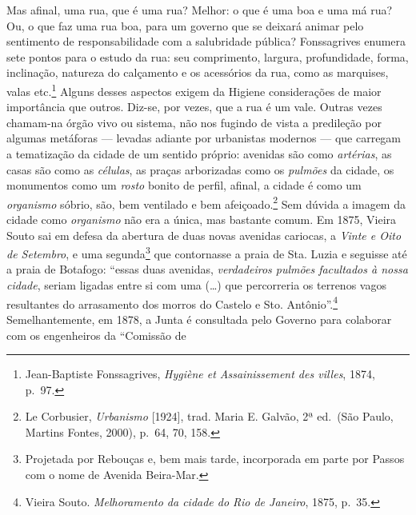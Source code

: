 Mas afinal, uma rua, que é uma rua? Melhor: o que é uma boa e uma má
rua? Ou, o que faz uma rua boa, para um governo que se deixará animar
pelo sentimento de responsabilidade com a salubridade pública?
Fonssagrives enumera sete pontos para o estudo da rua: seu comprimento,
largura, profundidade, forma, inclinação, natureza do calçamento e os
acessórios da rua, como as marquises, valas etc.\footnote{Jean-Baptiste
  Fonssagrives, \textit{Hygiène et Assainissement des villes}, 1874,
  p.~97.} Alguns desses aspectos exigem da Higiene considerações de
maior importância que outros. Diz-se, por vezes, que a rua é um vale.
Outras vezes chamam-na órgão vivo ou sistema, não nos fugindo de vista a
predileção por algumas metáforas --- levadas adiante por urbanistas
modernos --- que carregam a tematização da cidade de um sentido próprio:
avenidas são como \textit{artérias}, as casas são como as \textit{células},
as praças arborizadas como os \textit{pulmões} da cidade, os monumentos
como um \textit{rosto} bonito de perfil, afinal, a cidade é como um
\textit{organismo} sóbrio, são, bem ventilado e bem afeiçoado.\footnote{Le
  Corbusier, \textit{Urbanismo} {[}1924{]}, trad. Maria E. Galvão, 2ª
  ed.~(São Paulo, Martins Fontes, 2000), p.~64, 70, 158.} Sem dúvida a
imagem da cidade como \textit{organismo} não era a única, mas bastante
comum. Em 1875, Vieira Souto sai em defesa da abertura de duas novas
avenidas cariocas, a \textit{Vinte e Oito de Setembro}, e uma
segunda\footnote{Projetada por Rebouças e, bem mais tarde, incorporada
  em parte por Passos com o nome de Avenida Beira-Mar.} que contornasse
a praia de Sta. Luzia e seguisse até a praia de Botafogo: ``essas duas
avenidas, \textit{verdadeiros pulmões facultados à nossa cidade}, seriam
ligadas entre si com uma (\ldots{}) que percorreria os terrenos vagos
resultantes do arrasamento dos morros do Castelo e Sto.
Antônio''.\footnote{Vieira Souto. \textit{Melhoramento da cidade do Rio de
  Janeiro}, 1875, p.~35.} Semelhantemente, em 1878, a Junta é consultada
pelo Governo para colaborar com os engenheiros da ``Comissão de

